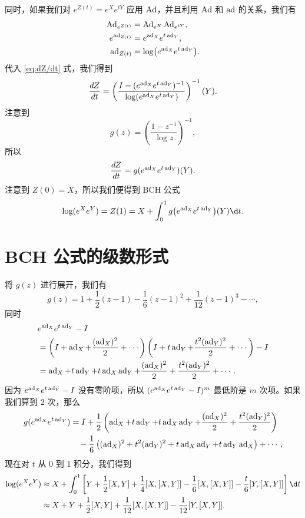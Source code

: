 同时，如果我们对 $e^{Z(t)}=e^Xe^{tY}$ 应用 $\operatorname{Ad}$，并且利用 $\operatorname{Ad}$ 和 $\operatorname{ad}$
的关系，我们有
\begin{align*}
  \operatorname{Ad}_{e^{Z(t)}}&=\operatorname{Ad}_{e^X}\operatorname{Ad}_{e^{tY}}, \\
  e^{\operatorname{ad}_{Z(t)}}&=e^{\operatorname{ad}_X}e^{t\operatorname{ad}_Y},\\
  \operatorname{ad}_{Z(t)}&=\log\bigl(e^{\operatorname{ad}_X}e^{t\operatorname{ad}_Y}\bigr).
\end{align*}
代入 \eqref{eq:dZ/dt} 式，我们得到
\begin{equation}
  \frac{d Z}{dt}=\left(
    \frac{I-(e^{\operatorname{ad}_X}e^{t\operatorname{ad}_Y})^{-1}}{\log(e^{\operatorname{ad}_X}e^{t\operatorname{ad}_Y})}
  \right)^{-1}(Y).
\end{equation}
注意到
\[
  g(z)=\left(\frac{1-z^{-1}}{\log z}\right)^{-1},
\]
所以
\[
  \frac{d Z}{d t}=g(e^{\operatorname{ad}_X}e^{t\operatorname{ad}_Y})(Y).
\]
注意到 $Z(0)=X$，所以我们便得到 BCH 公式
\[
  \log(e^Xe^Y)=Z(1)=X+\int_0^1 g\bigl(e^{\ad_X}e^{t\ad_Y}\bigr)(Y)\d t.
\]

\section{BCH 公式的级数形式}

将 $g(z)$ 进行展开，我们有
\[
  g(z)=1+\frac{1}{2}(z-1)-\frac{1}{6}(z-1)^2+\frac{1}{12}(z-1)^3-\cdots,
\]
同时
\begin{align*}
  &e^{\operatorname{ad}_X}e^{t\operatorname{ad}_Y}-I\\
  &=\left(
    I+\operatorname{ad}_X+\frac{(\operatorname{ad}_X)^2}{2}+\cdots
  \right)\left(
    I+t\operatorname{ad}_Y+\frac{t^2(\operatorname{ad}_Y)^2}{2}+\cdots
  \right)-I \\
  &=\operatorname{ad}_X+t\operatorname{ad}_Y+t\operatorname{ad}_X\operatorname{ad}_Y+\frac{(\operatorname{ad}_X)^2}{2}+ \frac{t^2(\operatorname{ad}_Y)^2}{2}+\cdots.
\end{align*}
因为 $e^{\operatorname{ad}_X}e^{t\operatorname{ad}_Y}-I$ 没有零阶项，所以 $(e^{\operatorname{ad}_X}e^{t\operatorname{ad}_Y}-I)^m$
最低阶是 $m$ 次项。如果我们算到 $2$ 次，那么
\begin{align*}
    g(e^{\operatorname{ad}_X}e^{t\operatorname{ad}_Y})&=I+\frac{1}{2}\left(
    \operatorname{ad}_X+t\operatorname{ad}_Y+t\operatorname{ad}_X\operatorname{ad}_Y+\frac{(\operatorname{ad}_X)^2}{2}+\frac{t^2(\operatorname{ad}_Y)^2}{2}
  \right)\\
  &\quad -\frac{1}{6}\left(
    (\operatorname{ad}_X)^2+t^2(\operatorname{ad}_Y)^2+t\operatorname{ad}_X\operatorname{ad}_Y+t\operatorname{ad}_Y\operatorname{ad}_X
  \right)+\cdots,
\end{align*}
现在对 $t$ 从 $0$ 到 $1$ 积分，我们得到
\begin{align*}
  \log(e^Xe^Y)&\approx X+\int_0^1
  \left[
    Y+\frac{1}{2}[X,Y]+\frac{1}{4}[X,[X,Y]]-\frac{1}{6}[X,[X,Y]]
    -\frac{t}{6}[Y,[X,Y]]
  \right]\d t\\
  &\approx X+Y+\frac{1}{2}[X,Y]+\frac{1}{12}[X,[X,Y]]-\frac{1}{12}[Y,[X,Y]].
\end{align*}






